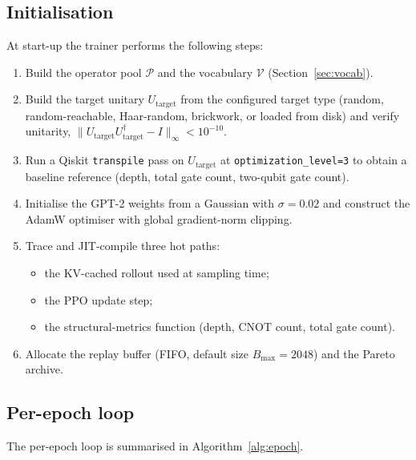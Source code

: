 \documentclass[11pt,a4paper]{article}
\newcommand{\Utarget}{U_{\text{target}}}
\begin{document}
\subsection{Initialisation}

At start-up the trainer performs the following steps:
\begin{enumerate}[leftmargin=2em]
  \item Build the operator pool $\mathcal{P}$ and the vocabulary $\mathcal{V}$ (Section~\ref{sec:vocab}).
  \item Build the target unitary $\Utarget$ from the configured target type (random, random-reachable, Haar-random, brickwork, or loaded from disk) and verify unitarity, $\|\Utarget\Utarget^{\dagger} - I\|_{\infty} < 10^{-10}$.
  \item Run a Qiskit \texttt{transpile} pass on $\Utarget$ at \texttt{optimization\_level=3} to obtain a baseline reference (depth, total gate count, two-qubit gate count).
  \item Initialise the GPT-2 weights from a Gaussian with $\sigma = 0.02$ and construct the AdamW optimiser with global gradient-norm clipping.
  \item Trace and JIT-compile three hot paths:
    \begin{itemize}
      \item the KV-cached rollout used at sampling time;
      \item the PPO update step;
      \item the structural-metrics function (depth, CNOT count, total gate count).
    \end{itemize}
  \item Allocate the replay buffer (FIFO, default size $B_{\max} = 2048$) and the Pareto archive.
\end{enumerate}

\subsection{Per-epoch loop}
\label{sec:per-epoch}

The per-epoch loop is summarised in Algorithm~\ref{alg:epoch}.
\end{document}
